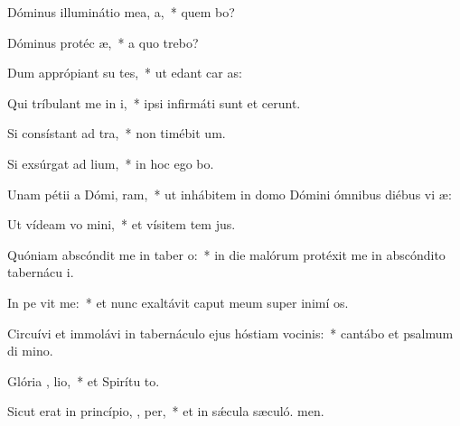 \item Dóminus illuminátio mea,   a,~* quem bo?
\item Dóminus protéc  æ,~* a quo trebo?
\item Dum apprópiant su  tes,~* ut edant car as:
\item Qui tríbulant me in i,~* ipsi infirmáti sunt et cerunt.
\item Si consístant ad  tra,~* non timébit  um.
\item Si exsúrgat ad  lium,~* in hoc ego bo.
\item Unam pétii a Dómi,  ram,~* ut inhábitem in domo Dómini ómnibus diébus vi æ:
\item Ut vídeam vo mini,~* et vísitem tem jus.
\item Quóniam abscóndit me in taber o:~* in die malórum protéxit me in abscóndito tabernácu i.
\item In pe vit me:~* et nunc exaltávit caput meum super inimí os.
\item Circuívi et immolávi in tabernáculo ejus hóstiam vocinis:~* cantábo et psalmum di mino.
\item Glória ,  lio,~* et Spirítu to.
\item Sicut erat in princípio,  ,  per,~* et in sǽcula sæculó. men.
